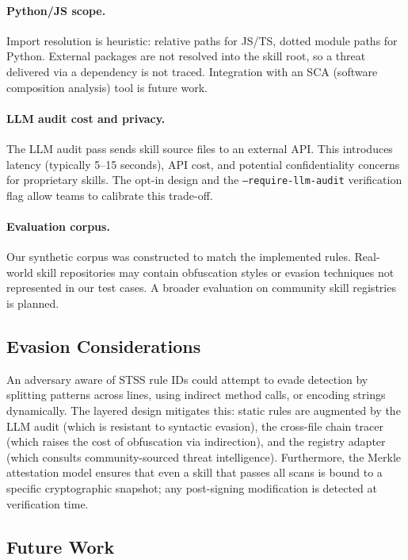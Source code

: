 \documentclass[11pt,twocolumn]{article}
\begin{document}
\paragraph{Python/JS scope.} Import resolution is heuristic: relative paths
for JS/TS, dotted module paths for Python. External packages are not resolved
into the skill root, so a threat delivered via a dependency is not traced.
Integration with an SCA (software composition analysis) tool is future work.

\paragraph{LLM audit cost and privacy.} The LLM audit pass sends skill
source files to an external API. This introduces latency (typically 5--15
seconds), API cost, and potential confidentiality concerns for proprietary
skills. The opt-in design and the \texttt{--require-llm-audit} verification
flag allow teams to calibrate this trade-off.

\paragraph{Evaluation corpus.} Our synthetic corpus was constructed to match
the implemented rules. Real-world skill repositories may contain obfuscation
styles or evasion techniques not represented in our test cases. A broader
evaluation on community skill registries is planned.

\subsection{Evasion Considerations}

An adversary aware of STSS rule IDs could attempt to evade detection by
splitting patterns across lines, using indirect method calls, or encoding
strings dynamically. The layered design mitigates this: static rules are
augmented by the LLM audit (which is resistant to syntactic evasion), the
cross-file chain tracer (which raises the cost of obfuscation via indirection),
and the registry adapter (which consults community-sourced threat intelligence).
Furthermore, the Merkle attestation model ensures that even a skill that passes
all scans is bound to a specific cryptographic snapshot; any post-signing
modification is detected at verification time.

\subsection{Future Work}
\end{document}

